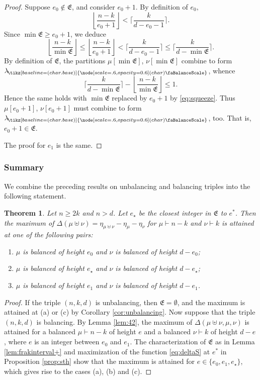 \documentclass[12pt,dvipsnames,accepted=2016-08-18,a4paper,onecolumn]{quantumarticle}
\newcommand{\floor}[1]{\left\lfloor #1 \right\rfloor}
\def\bal{\tikz[baseline=(char.base)]{
  \node[scale=.6,opacity=0.6] (char) {\faBalanceScale}}
}
\def\lab{\lambda_{\!\bal}}
\numberwithin{equation}{section}
\newtheorem{theorem}{Theorem}[section]
\theoremstyle{definition}
\begin{document}
\begin{proof}
Suppose $e_0\not\in\mathfrak E$, and consider $e_0+1$. By definition of $e_0,$
\[
    \floor{\frac{n-k}{e_0+1}} < \bigg\lceil\frac{k}{d-e_0-1}\bigg\rceil.
\]
Since $\min\mathfrak E\geq e_0+1$, we deduce
\begin{equation}\label{eq:squeeze}
\floor{\frac{n-k}{\min\mathfrak E}} \leq \floor{\frac{n-k}{e_0+1}} < \bigg\lceil\frac{k}{d-e_0-1}\bigg\rceil \leq 
 \bigg\lceil\frac{k}{d-\min\mathfrak E}\bigg\rceil
.
\end{equation}
By definition of $\mathfrak E$, the partitions 
$\mu[\min\mathfrak E]$, $\nu[\min\mathfrak E]$ combine to form $\lab$, 
whence 
\[
    \bigg\lceil\frac{k}{d-\min\mathfrak E}\bigg\rceil-\floor{\frac{n-k}{\min\mathfrak E}}\leq 1.
\]
Hence the same holds with $\min\mathfrak E$ replaced by $e_0+1$ by
\eqref{eq:squeeze}. Thus $\mu[e_0+1]$, $\nu[e_0+1]$ must combine to form $\lab$, too. That is, $e_0+1\in\mathfrak E$.

The proof for $e_1$ is the same.
\end{proof}


\def\close#1{\left\lfloor #1 \right\rceil}


\subsubsection{Summary}

We combine the preceding results on unbalancing and balancing triples into the following statement.

\begin{theorem}\label{th:dbip}
Let $n\geq2k$ and $n>d$. 
Let $e_\star$ be the closest integer in 
$\mathfrak E$ to $e^*$. Then the maximum of $\Delta(\mu\uplus\nu)=\eta_{\mu\uplus\nu}-\eta_\mu-\eta_\nu$ for $\mu\vdash n-k$ and $\nu\vdash k$ is attained at one of the following pairs:
\begin{enumerate}[\rm (a)]
    \item
$\mu$ is balanced of height $e_0$ and $\nu$ is  balanced of height $d-e_0$;
   \item
$\mu$ is balanced of height $e_\star$ and $\nu$ is  balanced of height $d-e_\star$;
   \item
$\mu$ is balanced of height $e_1$ and $\nu$ is  balanced of height $d-e_1$.
\end{enumerate}
\end{theorem}

\begin{proof}
If the triple $(n,k,d)$ is unbalancing, then $\mathfrak{E}=\emptyset$, and the maximum is attained at (a) or (c) by Corollary \ref{cor:unbalancing}.
Now suppose that the triple $(n,k,d)$ is balancing. 
By Lemma \ref{lem:42}, the maximum of $\Delta(\mu\uplus\nu,\mu,\nu)$ is attained for a balanced $\mu\vdash n-k$ of height $e$ and a balanced $\nu\vdash k$ of height $d-e$, where $e$ is an integer between $e_0$ and $e_1$.
The characterization of $\mathfrak{E}$ as in Lemma \ref{lem:frakinterval+} and maximization of the function \eqref{eq:deltaS} at $e^*$ in Proposition \ref{prop:sth} show that the maximum is attained for $e\in\{e_0,e_1,e_\star\}$, which gives rise to the cases (a), (b) and (c).
\end{proof}
\end{document}
